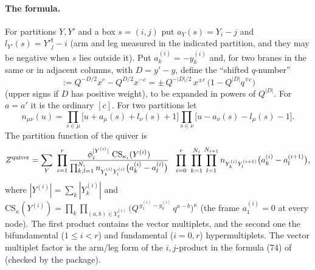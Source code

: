 \documentclass[11pt]{article}
\theoremstyle{plain}
\theoremstyle{definition}
\theoremstyle{remark}
\newcommand{\tr}{{\mathsf t}}
\newcommand{\lt}[1]{#1^{\tr}}
\begin{document}
\paragraph{The formula.} For partitions $Y,Y'$ and a box $s=(i,j)$ put $a_Y(s)=Y_i-j$ and
$l_{Y'}(s)=\lt{Y'}_j-i$ (arm and leg measured in the indicated partition, and they may be negative
when $s$ lies outside it). Put $a^{(i)}_k=-y^{(i)}_k$ and, for two branes in the same or in
adjacent columns, with $D=y'-y$, define the ``shifted $q$-number''
\begin{equation}
[a-a'+c]:=Q^{-D/2}x^{c}-Q^{D/2}x^{-c}=\pm\,Q^{-|D|/2}\,x^{\pm c}\,\big(1-Q^{|D|}q^{\mp c}\big)
\end{equation}
(upper signs if $D$ has positive weight), to be expanded in powers of $Q^{|D|}$. For $a=a'$ it
is the ordinary $[c]$. For two
partitions let
\begin{equation}
n_{\mu\nu}(u)=\prod_{s\in\mu}\big[u+a_\mu(s)+l_\nu(s)+1\big]\prod_{s\in\nu}\big[u-a_\nu(s)-l_\mu(s)-1\big] .
\end{equation}
The partition function of the quiver is
\begin{equation}\label{eq:quiver}
Z^{\rm quiver}=\sum_{Y}\ \prod_{i=1}^{r}\frac{\phi_i^{|Y^{(i)}|}\ \mathrm{CS}_{\kappa_i}(Y^{(i)})}
{\prod_{k,l=1}^{N_i}n_{Y^{(i)}_kY^{(i)}_l}\big(a^{(i)}_k-a^{(i)}_l\big)}\ \
\prod_{i=0}^{r}\ \prod_{k=1}^{N_i}\prod_{l=1}^{N_{i+1}}n_{Y^{(i)}_kY^{(i+1)}_l}\big(a^{(i)}_k-a^{(i+1)}_l\big),
\end{equation}
where $|Y^{(i)}|=\sum_k|Y^{(i)}_k|$ and
$\mathrm{CS}_\kappa(Y^{(i)})=\prod_k\prod_{(a,b)\in Y^{(i)}_k}\big(Q^{\,y^{(i)}_1-y^{(i)}_k}\,q^{a-b}\big)^{\kappa}$
(the frame $a^{(i)}_1=0$ at every node). The first product contains the vector multiplets, and the
second one the bifundamental ($1\le i<r$) and fundamental ($i=0,r$) hypermultiplets. The
vector multiplet factor is the arm/leg form of the $i,j$-product in the formula (74) of~\cite{IKP-SUN}
(checked by the package).
\end{document}
